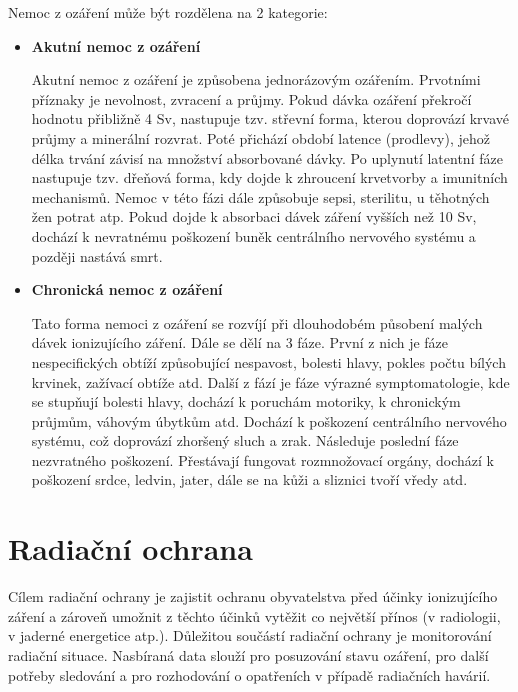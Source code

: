 Nemoc z ozáření může být rozdělena na 2 kategorie: \cite{nemoc}

\begin{itemize}
	\item \textbf{Akutní nemoc z ozáření}
	
		Akutní nemoc z ozáření je způsobena jednorázovým ozářením. Prvotními příznaky je nevolnost, zvracení a průjmy. Pokud dávka ozáření překročí hodnotu přibližně 4 Sv, nastupuje tzv. střevní forma, kterou doprovází krvavé průjmy a minerální rozvrat. Poté přichází období latence (prodlevy), jehož délka trvání závisí na množství absorbované dávky. Po uplynutí latentní fáze nastupuje tzv. dřeňová forma, kdy dojde k zhroucení krvetvorby a imunitních mechanismů. Nemoc v této fázi dále způsobuje sepsi, sterilitu, u těhotných žen potrat atp. Pokud dojde k absorbaci dávek záření vyšších než 10 Sv, dochází k nevratnému poškození buněk centrálního nervového systému a později nastává smrt.
		
	\item \textbf{Chronická nemoc z ozáření}
	
		Tato forma nemoci z ozáření se rozvíjí při dlouhodobém působení malých dávek ionizujícího záření. Dále se dělí na 3 fáze. První z nich je fáze nespecifických obtíží způsobující nespavost, bolesti hlavy, pokles počtu bílých krvinek, zažívací obtíže atd. Další z fází je fáze výrazné symptomatologie, kde se stupňují bolesti hlavy, dochází k poruchám motoriky, k chronickým průjmům, váhovým úbytkům atd. Dochází k poškození centrálního nervového systému, což doprovází zhoršený sluch a zrak. Následuje poslední fáze nezvratného poškození. Přestávají fungovat rozmnožovací orgány, dochází k poškození srdce, ledvin, jater, dále se na kůži a sliznici tvoří vředy atd. 

\end{itemize}

\section{Radiační ochrana} 
Cílem radiační ochrany je zajistit ochranu obyvatelstva před účinky ionizujícího záření a zároveň umožnit z těchto účinků vytěžit co největší přínos (v radiologii, v jaderné energetice atp.). Důležitou součástí radiační ochrany je monitorování radiační situace. Nasbíraná data slouží pro posuzování stavu ozáření, pro další potřeby sledování a pro rozhodování o opatřeních v případě radiačních havárií. \cite{suroRadOch} \cite{sujbRadSit}

